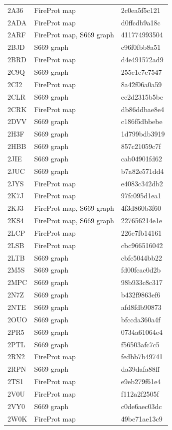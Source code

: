 \begin{longtable}{lll}
2A36 & FireProt map & 2c0ea5f5c121\\
2ADA & FireProt map & d0ffcdb9a18c\\
2ARF & FireProt map, S669 graph & 411774993504\\
2BJD & S669 graph & c96f0fbb8a51\\
2BRD & FireProt map & d4e491572ad9\\
2C9Q & S669 graph & 255e1e7e7547\\
2CI2 & FireProt map & 8a42f06a0a59\\
2CLR & S669 graph & ee2d2315b5be\\
2CRK & FireProt map & db86ddbae8e4\\
2DVV & S669 graph & c186f5dbbebe\\
2H3F & S669 graph & 1d799bdb3919\\
2HBB & S669 graph & 857c21059c7f\\
2JIE & S669 graph & cab04901fd62\\
2JUC & S669 graph & b7a82e571dd4\\
2JYS & FireProt map & e4083c342db2\\
2K7J & FireProt map & 97fc095d1ea1\\
2KJ3 & FireProt map, S669 graph & 4f3d860b3f60\\
2KS4 & FireProt map, S669 graph & 227656214e1e\\
2LCP & FireProt map & 226e7fb14161\\
2LSB & FireProt map & cbc966516042\\
2LTB & S669 graph & cbfe5044bb22\\
2M5S & S669 graph & fd00fcac0d2b\\
2MPC & S669 graph & 98b933c8c317\\
2N7Z & S669 graph & b432f9863ef6\\
2NTE & S669 graph & afd8fdb90873\\
2OUO & S669 graph & bfccda360a4f\\
2PR5 & S669 graph & 0734a61064e4\\
2PTL & S669 graph & f56503afc7c5\\
2RN2 & FireProt map & fedbb7b49741\\
2RPN & S669 graph & da39dafa88ff\\
2TS1 & FireProt map & e9eb279f61e4\\
2V0U & FireProt map & f112a2f2505f\\
2VY0 & S669 graph & c0de6aec03dc\\
2W0K & FireProt map & 49be71ae13c9\\

\end{longtable}
